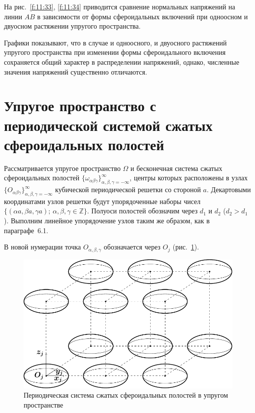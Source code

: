 На рис.~\ref{f:11:33}, \ref{f:11:34} приводится сравнение нормальных напряжений на линии $AB$ в зависимости от формы сфероидальных включений при одноосном и двуосном растяжении упругого пространства.

Графики показывают, что в случае и одноосного, и двуосного растяжений упругого пространства при изменении формы сфероидального включения сохраняется общий характер в распределении напряжений, однако, численные значения напряжений существенно отличаются.


\section[Упругое пространство с периодической системой сжатых сфероидальных полостей]{Упругое пространство с периодической системой сжатых сфероидальных полостей}

Рассматривается упругое пространство $\Omega$ и бесконечная система сжатых сфероидальных полостей $\{\omega_{\alpha\beta\gamma}\}_{\alpha,\beta,\gamma=-\infty}^\infty$, центры которых расположены в узлах $\{O_{\alpha\beta\gamma}\}_{\alpha,\beta,\gamma=-\infty}^\infty$ кубической периодической решетки со стороной $a$. Декартовыми координатами узлов решетки будут упорядоченные наборы чисел $\{(\alpha a,\beta a,\gamma a);\,\alpha,\beta,\gamma\in\mathbb{Z}\}$. Полуоси полостей обозначим через $d_1$ и $d_2$ ($d_2>d_1$). Выполним линейное упорядочение узлов таким же образом, как в параграфе~6.1.\sloppy

В новой нумерации точка $O_{\alpha,\beta,\gamma}$ обозначается через $O_j$ (рис.~\ref{f:11:1b}).

\begin{figure}[h!]
\centering
\includegraphics[width=12cm]{oblate-spheroids-periodic.pdf}
\caption{Периодическая система сжатых сфероидальных полостей в упругом пространстве}
\label{f:11:1b}
\end{figure}


